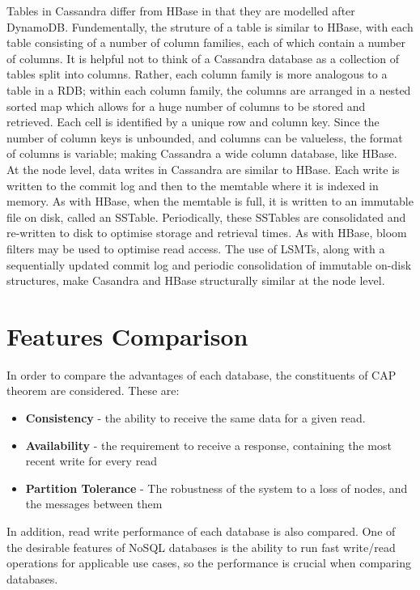 \documentclass[10pt]{article}
\begin{document}
Tables in Cassandra differ from HBase in that they are modelled after DynamoDB. Fundementally, the struture of a table is similar to HBase, with each table consisting of a number of column families, each of which contain a number of columns. It is helpful not to think of a Cassandra database as a collection of tables split into columns. Rather, each column family is more analogous to a table in a RDB; within each column family, the columns are arranged in a nested sorted map which allows for a huge number of columns to be stored and retrieved. Each cell is identified by a unique row and column key. Since the number of column keys is unbounded, and columns can be valueless, the format of columns is variable; making Cassandra a wide column database, like HBase.\\

At the node level, data writes in Cassandra are similar to HBase. Each write is written to the commit log and then to the memtable where it is indexed in memory. As with HBase, when the memtable is full, it is written to an immutable file on disk, called an SSTable. Periodically, these SSTables are consolidated and re-written to disk to optimise storage and retrieval times. As with HBase, bloom filters may be used to optimise read access. The use of LSMTs, along with a sequentially updated commit log and periodic consolidation of immutable on-disk structures, make Casandra and HBase structurally similar at the node level.

\section{Features Comparison}
In order to compare the advantages of each database, the constituents of CAP theorem are considered. These are:
\begin{itemize}
\item {\textbf{Consistency} - the ability to receive the same data for a given read.}
\item {\textbf{Availability} - the requirement to receive a response, containing the most recent write for every read}
\item {\textbf{Partition Tolerance} - The robustness of the system to a loss of nodes, and the messages between them}
\end{itemize}

In addition, read write performance of each database is also compared. One of the desirable features of NoSQL databases is the ability to run fast write/read operations for applicable use cases, so the performance is crucial when comparing databases.
\end{document}
